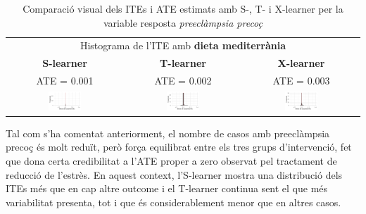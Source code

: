 \documentclass[../main.tex]{subfiles}
\begin{document}
    \begin{table}[H]
        \centering
        \begin{tabular}{ccc}
        \multicolumn{3}{c}{Histograma de l'ITE amb \textbf{dieta mediterrània}} \\
        \small \textbf{S-learner} & \small \textbf{T-learner} & \small \textbf{X-learner} \\
        \footnotesize ATE = 0.001 & \footnotesize ATE = 0.002 & \footnotesize ATE = 0.003 \\
        \includegraphics[width=0.3\textwidth]{imgs/histogrames/hist(PEearly)S_tract2.jpg} &
        \includegraphics[width=0.3\textwidth]{imgs/histogrames/hist(PEearly)T_tract2.jpg} &
        \includegraphics[width=0.3\textwidth]{imgs/histogrames/hist(PEearly)X_tract2.jpg} \\
        \end{tabular}
        \caption{\footnotesize Comparació visual dels ITEs i ATE estimats amb S-, T- i X-learner per la variable resposta \textit{preeclàmpsia precoç}} 
        \label{tab:histITE_PEearly2}
    \end{table}

    Tal com s’ha comentat anteriorment, el nombre de casos amb preeclàmpsia precoç és molt reduït, però força equilibrat entre els tres grups d’intervenció, fet que dona certa credibilitat a l’ATE proper a zero observat pel tractament de reducció de l’estrès. En aquest context, l’S-learner mostra una distribució dels ITEs més que en cap altre outcome i el T-learner continua sent el que més variabilitat presenta, tot i que és considerablement menor que en altres casos.
\end{document}

